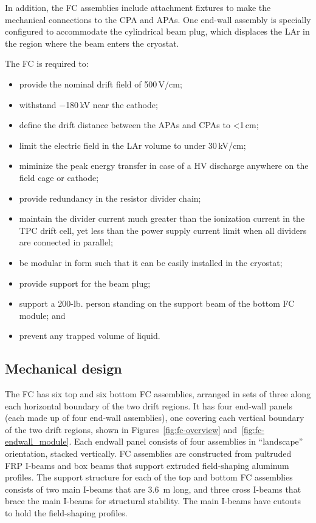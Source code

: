 In addition, the FC assemblies include attachment fixtures to make the mechanical connections to the CPA and APAs.
One end-wall assembly is specially configured to accommodate the
cylindrical beam plug, which displaces the LAr in the region where the beam enters the cryostat.

The FC is required to:
\begin{itemize}
\item provide the nominal drift field of 500\,V/cm;
\item withstand $-$180\,kV near the cathode;
\item define the drift distance between the APAs and CPAs to <1\,cm;
\item limit the electric field in the LAr volume to under 30\,kV/cm;
\item miminize the peak energy transfer in case of a HV discharge anywhere on the field cage or cathode;
\item provide redundancy in the resistor divider chain;
\item maintain the divider current much greater than the ionization current in the TPC drift cell, yet less than the power supply current limit when all dividers are connected in parallel;
\item be modular in form such that it can be easily installed in the cryostat;
\item provide support for the beam plug; 
\item support a 200-lb. person standing on the support beam of the bottom FC module; and
\item prevent any trapped volume of liquid.
\end{itemize}

\subsection{Mechanical design}

The FC has six top and six bottom FC assemblies, arranged in sets of three along each horizontal boundary of the two drift regions. It has 
four end-wall panels (each made up of four end-wall assemblies), one covering each vertical boundary of the two drift regions, shown in Figures~\ref{fig:fc-overview} and~\ref{fig:fc-endwall_module}.
Each endwall panel consists of four assemblies in ``landscape'' orientation, stacked vertically.
FC assemblies are constructed from pultruded FRP I-beams and box beams that support extruded field-shaping aluminum profiles. The support structure for each of the top and bottom FC assemblies consists of two main I-beams that are 3.6~m long, and three cross I-beams that brace the main I-beams for structural stability. The main I-beams have cutouts to hold the field-shaping profiles. 

